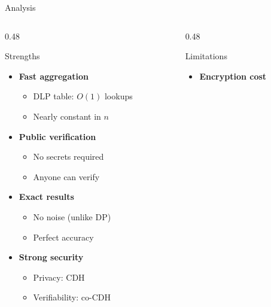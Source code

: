 \documentclass[aspectratio=169,10pt]{beamer}
\begin{document}
\begin{frame}{Analysis}
    \begin{columns}[T]
        \begin{column}{0.48\textwidth}
            \begin{block}{Strengths}
                \begin{itemize}
                    \item \textbf{Fast aggregation}
                        \begin{itemize}
                            \item DLP table: $O(1)$ lookups
                            \item Nearly constant in $n$
                        \end{itemize}
                    \item \textbf{Public verification}
                        \begin{itemize}
                            \item No secrets required
                            \item Anyone can verify
                        \end{itemize}
                    \item \textbf{Exact results}
                        \begin{itemize}
                            \item No noise (unlike DP)
                            \item Perfect accuracy
                        \end{itemize}
                    \item \textbf{Strong security}
                        \begin{itemize}
                            \item Privacy: CDH
                            \item Verifiability: co-CDH
                        \end{itemize}
                \end{itemize}
            \end{block}
        \end{column}
        \begin{column}{0.48\textwidth}
            \begin{alertblock}{Limitations}
                \begin{itemize}
                    \item \textbf{Encryption cost}

\end{itemize}
\end{alertblock}
\end{column}
\end{columns}
\end{frame}
\end{document}
